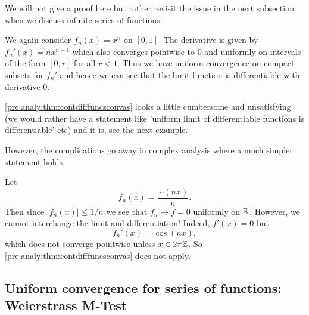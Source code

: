 \documentclass[10pt, a4paper]{article}
\begin{document}
We will not give a proof here but rather revisit the issue in the next subsection when we discuss infinite series of functions.

\begin{example}
    We again consider $f_n(x) = x ^ n$ on $[0, 1]$.
    The derivative is given by $f_n'(x) = nx ^ {n - 1}$ which also converges pointwise to $0$ and uniformly on intervals of the form $[0, r]$ for all $r < 1$.
    Thus we have uniform convergence on compact subsets for $f_n'$ and hence we can see that the limit function is differentiable with derivative $0$.
\end{example}

\begin{remark}
    \autoref{pre:analy:thm:contdifffuncsconvas} looks a little cumbersome and unsatisfying
    (we would rather have a statement like 'uniform limit of differentiable functions is differentiable' etc)
    and it is,
    see the next example.

    However,
    the complications go away in complex analysis where a much simpler statement holds.
\end{remark}

\begin{example}
    Let
    \[
    f_n(x) = \frac{\sim(nx)}{n}.
    \]
    Then since $|f_n(x)| \leq 1 / n$ we see that $f_n \rightarrow f = 0$ uniformly on $\mathbb{R}$.
    However,
    we cannot interchange the limit and differentiation!
    Indeed,
    $f'(x) = 0$ but
    \[
    f_n'(x) = \cos(nx),
    \]
    which does not converge pointwise unless $x \in 2\pi\mathbb{Z}$.
    So \autoref{pre:analy:thm:contdifffuncsconvas} does not apply.
\end{example}

\subsection{Uniform convergence for series of functions: Weierstrass M-Test}
\end{document}
